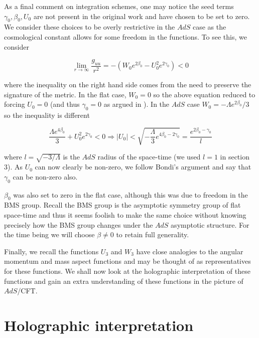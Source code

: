 \documentclass[a4paper,11pt]{article}
\numberwithin{equation}{section}
\begin{document}
As a final comment on integration schemes, one may notice the seed terms $\gamma_0, \beta_0, U_0$ are not present in the original work and have chosen to be set to zero. We consider these choices to be overly restrictive in the $AdS$ case as the cosmological constant allows for some freedom in the functions. To see this, we consider 

\begin{equation}
\lim_{r \rightarrow \infty} \frac{g_{uu}}{r^2} = -(W_0 e^{2\beta_0} - U_0^2 e^{2\gamma_0}) < 0 
\end{equation}

\noindent where the inequality on the right hand side comes from the need to preserve the signature of the metric. In the flat case, $W_0=0$ so the above equation reduced to forcing $U_0=0$ (and thus $\gamma_0=0$ as argued in \cite{Bondi:1962px}). In the $AdS$ case $W_0=-\Lambda e^{2\beta_0} /3$ so the inequality is different 

\begin{equation}
\frac{\Lambda e^{4\beta_0}}{3}+ U_0^2 e^{2\gamma_0} < 0 \Rightarrow |U_0|< \sqrt{-\frac{\Lambda}{3}e^{4\beta_0-2\gamma_0}}=\frac{e^{2\beta_0-\gamma_0}}{l}
\end{equation}

\noindent where $l=\sqrt{-3/\Lambda}$ is the $AdS$ radius of the space-time (we used $l=1$ in section 3). As $U_0$ can now clearly be non-zero, we follow Bondi's argument and say that $\gamma_0$ can be non-zero also. \par

$\beta_0$ was also set to zero in the flat case, although this was due to freedom in the BMS group. Recall the BMS group is the asymptotic symmetry group of flat space-time and thus it seems foolish to make the same choice without knowing precisely how the BMS group changes under the $AdS$ asymptotic structure. For the time being we will choose $\beta \neq 0 $ to retain full generality. \par

Finally, we recall the functions $U_3$ and $W_3$ have close analogies to the angular momentum and mass aspect functions and may be thought of as representatives for these functions. 	We shall now look at the holographic interpretation of these functions and gain an extra understanding of these functions in the picture of $AdS$/CFT.

\section{Holographic interpretation} \label{sec: Holographic_interpretation}
\end{document}
